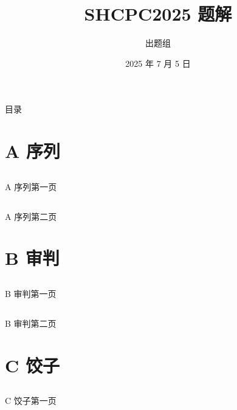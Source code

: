 \documentclass[11pt]{beamer}
\title{SHCPC2025 题解}
\author{出题组}
\date{2025 年 7 月 5 日}
\begin{document}
\begin{frame}
  \titlepage
\end{frame}

\begin{frame}{目录}
  \tableofcontents
\end{frame}

\section{A  序列}
\subsection*{}\begin{frame}{A  序列}第一页\end{frame}
\subsection*{}\begin{frame}{A  序列}第二页\end{frame}

\section{B  审判}
\subsection*{} \begin{frame}{B  审判}第一页\end{frame}
\subsection*{} \begin{frame}{B  审判}第二页\end{frame}

\section{C  饺子}
\subsection*{} \begin{frame}{C  饺子}第一页\end{frame}
\end{document}
